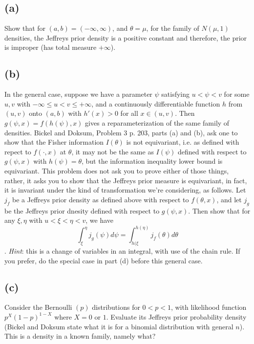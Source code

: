 \documentclass[11pt]{article}
\newcommand{\ProbS}{\iftrue}
\newcommand{\ProbE}{\fi}
\begin{document}
\subsection*{(a)}
\ProbS
Show that for $(a,b) = (-\infty, \infty)$, and $\theta = \mu$, for the family of $N(\mu, 1)$ densities, the Jeffreys prior density is a positive constant and therefore, the prior is improper (has total measure $+\infty$).
\ProbE

\subsection*{(b)}
\ProbS
In the general case, suppose we have a parameter $\psi$ satisfying
$u < \psi < v$ for some $u,v$ with $-\infty \leq u < v \leq +\infty$,
and a continuously differentiable function $h$ from $(u,v)$ onto $(a,b)$ with $h'(x)>0$ for all $x \in (u,v)$.
Then $g(\psi, x) = f(h(\psi), x)$ gives a reparameterization of the same family of densities.
Bickel and Doksum, Problem 3 p. 203, parts (a) and (b), ask one to show that the Fisher information $I(\theta)$ is not equivariant, i.e. as defined with repect to $f(\cdot, x)$ at $\theta$, it may not be the same as $I(\psi)$ defined with respect to $g(\psi, x)$ with $h(\psi)=\theta$, but the information inequality lower bound is equivariant.
This problem does not ask you to prove either of those things, rather, it asks you to show that the Jeffreys prior measure is equivariant, in fact, it is invariant under the kind of transformation we're considering, as follows.
Let $j_f$ be a Jeffreys prior density as defined above with respect to $f(\theta, x)$, and let $j_g$ be the Jeffreys prior dnesity defined with respect to $g(\psi, x)$. Then show that for any $\xi, \eta$ with $u < \xi < \eta < v$, we have
$$
\int_{\xi}^{\eta} j_g(\psi)d\psi = \int_{h(\xi}^{h(\eta)} j_f(\theta) d\theta
$$.
\emph{Hint}: this is a change of variables in an integral, with use of the chain rule. If you prefer, do the special case in part (d) before this general case.
\ProbE

\subsection*{(c)}
\ProbS
Consider the Bernoulli $(p)$ distributions for $0<p<1$, with likelihood function $p^X(1-p)^{1-X}$ where $X=0$ or $1$. Evaluate its Jeffreys prior probability density (Bickel and Doksum state what it is for a binomial distribution with general $n$). This is a density in a known family, namely what?
\ProbE
\end{document}
